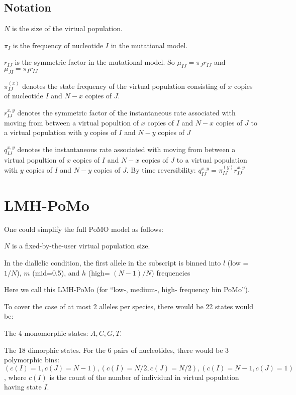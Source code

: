 \documentclass{llncs}
\begin{document}
\subsection*{Notation}
\begin{compactenum}
    \item $N$ is the size of the virtual population.
    \item $\pi_I$ is the frequency of nucleotide $I$ in the mutational model.
    \item $r_{IJ}$ is the symmetric factor in the mutational model. So $\mu_{IJ} = \pi_J r_{IJ}$ and $\mu_{JI} = \pi_I r_{IJ}$
    \item $\pi_{IJ}^{(x)}$ denotes the state frequency of the virtual population consisting of  $x$ copies of nucleotide $I$ and $N-x$ copies of $J$.
    \item $r_{IJ}^{x,y}$ denotes the symmetric factor of the instantaneous rate associated
    with moving from between a virtual popultion of $x$ copies of $I$ and $N-x$ copies of 
    $J$ to a virtual population with $y$ copies of $I$ and $N-y$ copies of $J$
    \item $q_{IJ}^{x,y}$ denotes the instantaneous rate associated
    with moving from between a virtual popultion of $x$ copies of $I$ and $N-x$ copies of 
    $J$ to a virtual population with $y$ copies of $I$ and $N-y$ copies of $J$.
    By time reversibility: $q_{IJ}^{x,y} = \pi_{IJ}^{(y)}r_{IJ}^{x,y}$
\end{compactenum}

\section*{LMH-PoMo}
One could simplify the full PoMO model as follows:
\begin{compactenum}
    \item $N$ is a fixed-by-the-user virtual population size.
    \item In the diallelic condition, the first allele in the subscript is binned into $l$ (low = $1/N$), $m$ (mid=0.5), and $h$ (high= $(N-1)/N$) frequencies
\end{compactenum}
Here we call this LMH-PoMo (for ``low-, medium-, high- frequency bin PoMo'').



To cover the case of at most 2 alleles per species, there would be 22 states would be:
\begin{compactenum}
    \item The 4 monomorphic states: $A, C, G, T$.
    \item The 18 dimorphic states. For the 6 pairs of nucleotides, there would be 3 polymorphic bins: $(c(I)=1, c(J)=N-1), (c(I)=N/2, c(J)=N/2), (c(I)=N-1, c(J)=1)$,
        where $c(I)$ is the count of the number of individual in virtual population having state $I$.
\end{compactenum}
\end{document}
